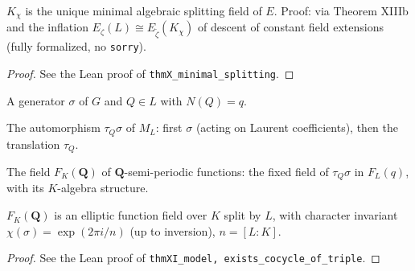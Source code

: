 \begin{theorem}
\label{thm:X}
\leanok
$K_\chi$ is the unique minimal algebraic splitting field of $E$. Proof: via Theorem XIIIb and the inflation $E_\zeta(L)\cong E_{\tilde\zeta}(K_\chi)$ of descent of constant field extensions (fully formalized, no \texttt{sorry}).
\end{theorem}
\begin{proof}
\leanok
See the Lean proof of \texttt{thmX\_minimal\_splitting}.
\end{proof}

\begin{definition}[Semi-periodic triple $\mathbf Q=(L,\sigma,Q)$]
\label{def:semi-periodic-triple}
\leanok
A generator $\sigma$ of $G$ and $Q\in L$ with $N(Q)=q$.
\end{definition}

\begin{definition}
\label{def:tau-Q-sigma}
\leanok
The automorphism $\tau_Q\sigma$ of $M_L$: first $\sigma$ (acting on Laurent coefficients), then the translation $\tau_Q$.
\end{definition}

\begin{definition}
\label{def:FKQ}
\leanok
The field $F_K(\mathbf Q)$ of $\mathbf Q$-semi-periodic functions: the fixed field of $\tau_Q\sigma$ in $F_L(q)$, with its $K$-algebra structure.
\end{definition}

\begin{theorem}[Theorem XI]
\label{thm:XI}
\leanok
$F_K(\mathbf Q)$ is an elliptic function field over $K$ split by $L$, with character invariant $\chi(\sigma)=\exp(2\pi i/n)$ (up to inversion), $n=[L:K]$.
\end{theorem}
\begin{proof}
\leanok
See the Lean proof of \texttt{thmXI\_model, exists\_cocycle\_of\_triple}.
\end{proof}

